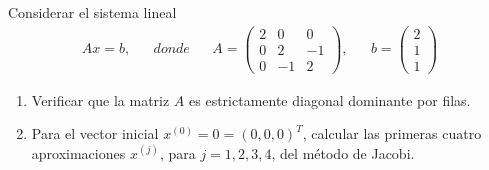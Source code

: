 \documentclass[12pt]{book}
\begin{document}
\eje Considerar el sistema lineal
\begin{align*}
    Ax=b, && donde && A=\begin{pmatrix}
    2 & 0 & 0\\
    0 & 2 & -1\\
    0 & -1 & 2
    \end{pmatrix}, && b=\begin{pmatrix}
    2\\
    1\\
    1
    \end{pmatrix}
\end{align*}
\renewcommand{\labelenumi}{(\alph{enumi})}
\begin{enumerate}
    \item Verificar que la matriz $A$ es estrictamente diagonal dominante por filas.
    \item Para el vector inicial $x^{(0)}=0=(0,0,0)^T$, calcular las primeras cuatro aproximaciones $x^{(j)}$, para $j=1,2,3,4$, del método de Jacobi.
\end{enumerate}
\end{document}
